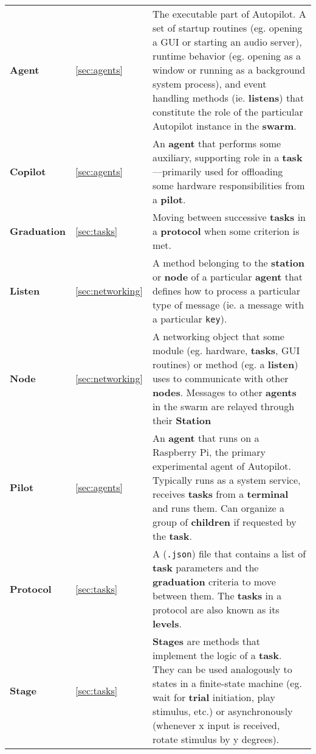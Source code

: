 \renewcommand{\arraystretch}{1.25}
\begin{table*}[!hb]
\noindent\begin{tabularx}{\linewidth}{llX}

 \textbf{Agent} & \ref{sec:agents} & The executable part of Autopilot. A set of startup routines (eg. opening a GUI or starting an audio server), runtime behavior (eg. opening as a window or running as a background system process), and event handling methods (ie. \textbf{listens}) that constitute the role of the particular Autopilot instance in the \textbf{swarm}. \\
 \textbf{Copilot} & \ref{sec:agents} & An \textbf{agent} that performs some auxiliary, supporting role in a \textbf{task}---primarily used for offloading some hardware responsibilities from a \textbf{pilot}. \\
 \textbf{Graduation} & \ref{sec:tasks} & Moving between successive \textbf{tasks} in a \textbf{protocol} when some criterion is met.  \\
 \textbf{Listen} & \ref{sec:networking} & A method belonging to the \textbf{station} or \textbf{node} of a particular \textbf{agent} that defines how to process a particular type of message (ie. a message with a particular \texttt{key}). \\
 \textbf{Node} & \ref{sec:networking} & A networking object that some module (eg. hardware, \textbf{tasks}, GUI routines) or method (eg. a \textbf{listen}) uses to communicate with other \textbf{nodes}. Messages to other \textbf{agents} in the swarm are relayed through their \textbf{Station} \\
 \textbf{Pilot} & \ref{sec:agents} & An \textbf{agent} that runs on a Raspberry Pi, the primary experimental agent of Autopilot. Typically runs as a system service, receives \textbf{tasks} from a \textbf{terminal} and runs them. Can organize a group of \textbf{children} if requested by the \textbf{task}. \\
 \textbf{Protocol} & \ref{sec:tasks} & A (\texttt{.json}) file that contains a list of \textbf{task} parameters and the \textbf{graduation} criteria to move between them. The \textbf{tasks} in a protocol are also known as its \textbf{levels}.  \\
 \textbf{Stage} & \ref{sec:tasks} & \textbf{Stages} are methods that implement the logic of a \textbf{task}. They can be used analogously to states in a finite-state machine (eg. wait for \textbf{trial} initiation, play stimulus, etc.) or asynchronously (whenever x input is received, rotate stimulus by y degrees). \\

\end{tabularx}
\end{table*}
